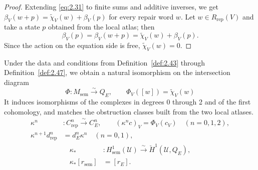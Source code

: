 \begin{proof}

Extending \eqref{eq:2.31} to finite sums and additive inverses, we get
$\beta_V(w+p)=\widetilde\chi_V(w)+\beta_V(p)$ for every repair word $w$. Let
$w\in R_{\mathrm{rep}}(V)$ and take a state $p$ obtained from the local atlas; then
\[
\beta_V(p)=\beta_V(w+p)
=\widetilde\chi_V(w)+\beta_V(p).
\]
Since the action on the equation side is free, $\widetilde\chi_V(w)=0$.

\end{proof}

\begin{theorem}\label{thm:2.49}

Under the data and conditions from Definition~\ref{def:2.43} through
Definition~\ref{def:2.47}, we obtain a natural isomorphism on the intersection diagram
\begin{equation*}
\Phi:M_{\mathrm{sem}}\xrightarrow{\sim}Q_E,
\qquad\Phi_V([w])=\widetilde\chi_V(w)
\tag{2.34}\label{eq:2.34}
\end{equation*}
It induces isomorphisms of the complexes in degrees 0 through 2 and of the first
cohomology, and matches the obstruction classes built from the two local atlases.
\begin{equation*}
\begin{aligned}
\kappa^n &: C^n_{\mathrm{rep}}\xrightarrow{\sim}C^n_E,
\qquad (\kappa^nc)_V=\Phi_V(c_V)\quad(n=0,1,2),\\
\kappa^{n+1}d^n_{\mathrm{rep}}&=d^n_E\kappa^n
\quad(n=0,1),
\end{aligned}
\tag{2.35}\label{eq:2.35}
\end{equation*}
\begin{equation*}
\begin{aligned}
\kappa_* &: H^1_{\mathrm{sem}}(\mathcal{U})\xrightarrow{\sim}\check H^1(\mathcal{U},Q_E),\\
\kappa_*[r_{\mathrm{sem}}]&=[r_E].
\end{aligned}
\tag{2.36}\label{eq:2.36}
\end{equation*}

\end{theorem}


